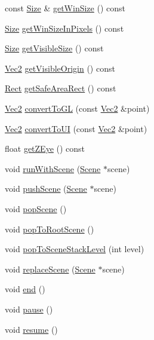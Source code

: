 \begin{DoxyCompactItemize}
\item 
const \hyperlink{classSize}{Size} \& \hyperlink{classDirector_a2528d17deb09cec6ee7209127719640c}{get\+Win\+Size} () const
\item 
\hyperlink{classSize}{Size} \hyperlink{classDirector_a2afa5db94fce20cd07c9f4fe57708e21}{get\+Win\+Size\+In\+Pixels} () const
\item 
\hyperlink{classSize}{Size} \hyperlink{classDirector_ac17725c3dbb4876d745d897cb436b638}{get\+Visible\+Size} () const
\item 
\hyperlink{classVec2}{Vec2} \hyperlink{classDirector_a712d994af29f122e1b6496dd671718d5}{get\+Visible\+Origin} () const
\item 
\hyperlink{classRect}{Rect} \hyperlink{classDirector_a64fae32c207654447373c95bad35de4d}{get\+Safe\+Area\+Rect} () const
\item 
\hyperlink{classVec2}{Vec2} \hyperlink{classDirector_a29371003ac8c3a6856eee412aa129d9c}{convert\+To\+GL} (const \hyperlink{classVec2}{Vec2} \&point)
\item 
\hyperlink{classVec2}{Vec2} \hyperlink{classDirector_a932324432ae4ccc8819db508951644e4}{convert\+To\+UI} (const \hyperlink{classVec2}{Vec2} \&point)
\item 
float \hyperlink{classDirector_ad245779e1e70b0195e761afc0582b1da}{get\+Z\+Eye} () const
\item 
void \hyperlink{classDirector_a893e73a440a7832097e858bf8b9dff8a}{run\+With\+Scene} (\hyperlink{classScene}{Scene} $\ast$scene)
\item 
void \hyperlink{classDirector_ad113f1a2b5ab297788caa791b57f458b}{push\+Scene} (\hyperlink{classScene}{Scene} $\ast$scene)
\item 
void \hyperlink{classDirector_a92916c5c47d0f0a202fe1a5023841e8b}{pop\+Scene} ()
\item 
void \hyperlink{classDirector_a3990819e9d112e26258290ca82d91999}{pop\+To\+Root\+Scene} ()
\item 
void \hyperlink{classDirector_a56f61d47f337d996c069ca7aac5b3c79}{pop\+To\+Scene\+Stack\+Level} (int level)
\item 
void \hyperlink{classDirector_a75d57e62351449bb5a4ed2cd7412fb25}{replace\+Scene} (\hyperlink{classScene}{Scene} $\ast$scene)
\item 
void \hyperlink{classDirector_ac609b09cf1e1054e588d2d25ecd51c36}{end} ()
\item 
void \hyperlink{classDirector_ad0e2e9b810e39c939e25ead3918faf00}{pause} ()
\item 
void \hyperlink{classDirector_a851df0aed8d550cc85159063b0c85dac}{resume} ()

\end{DoxyCompactItemize}
